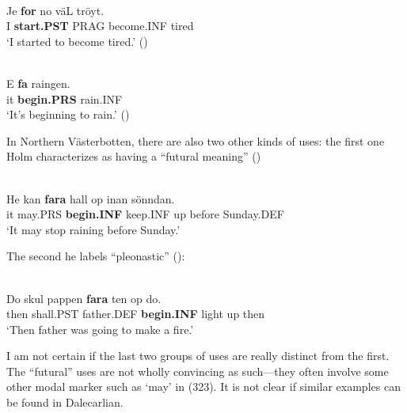 
\ea\label{}
\\
\gll Je  \textbf{for} no  väL  tröyt.\\
I  \textbf{start.PST} PRAG  become.INF  tired\\
\glt ‘I started to become tired.’ (\citet[19]{Holm1942})
\z

\ea\label{}
\\
\gll E  \textbf{fa} raingen.\\
it  \textbf{begin.PRS} rain.INF\\
\glt ‘It’s beginning to rain.’ (\citet[115]{Levander1909})
\z

In Northern Västerbotten, there are also two other kinds of uses: the first one Holm characterizes as having a “futural meaning” (\citet[20]{Holm1941})


\ea\label{}
\\
\gll He  kan  \textbf{fara} hall  op  inan  sönndan.\\
it  may.PRS  \textbf{begin.INF} keep.INF  up  before  Sunday.DEF\\
\glt  ‘It may stop raining before Sunday.’
\z

The second he labels “pleonastic” (\citet[21]{Holm1941}):


\ea\label{}
\\
\gll Do  skul  pappen  \textbf{fara} ten  op  do.\\
then  shall.PST  father.DEF  \textbf{begin.INF} light  up  then\\
\glt ‘Then father was going to make a fire.’
\z

I am not certain if the last two groups of uses are really distinct from the first. The “futural” uses are not wholly convincing as such—they often involve some other modal marker such as  ‘may’ in (323). It is not clear if similar examples can be found in Dalecarlian. 

